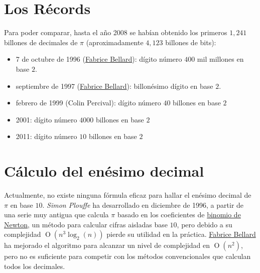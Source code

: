 
\section{Los Récords}

\begin{flushleft}
  Para poder comparar, hasta el año 2008 se habían obtenido los
  primeros $1,241$ billones de decimales de $\pi$ (aproximadamente
  $4,123$ billones de bits):
  \begin{itemize}
  \item 7 de octubre de 1996
    (\href{https://es.wikipedia.org/wiki/Fabrice_Bellard}{Fabrice
      Bellard}): dígito número $400$ mil millones en base $2$.
  \item septiembre de 1997
    (\href{https://es.wikipedia.org/wiki/Fabrice_Bellard}{Fabrice
      Bellard}): billonésimo dígito en base $2$.
  \item febrero de 1999 (Colin Percival): dígito número $40$ billones en
    base $2$
  \item 2001: dígito número $4000$ billones en base $2$
  \item 2011: dígito número $10$ billones en base $2$
  \end{itemize}
\end{flushleft}

\section{Cálculo del enésimo decimal}

\begin{flushleft}
  Actualmente, no existe ninguna fórmula eficaz para hallar el enésimo
  decimal de $\pi$ en base $10$. \textit{Simon Plouffe} ha
  desarrollado en diciembre de 1996, a partir de una serie muy antigua
  que calcula $\pi$ basado en los coeficientes de
  \href{https://es.wikipedia.org/wiki/Binomio_de_Newton}{binomio de
    Newton}, un método para calcular cifras aisladas base $10$, pero
  debido a su complejidad $\operatorname{O}(n^{3}\log_{2}(n))$ pierde
  su utilidad en la
  práctica. \href{https://es.wikipedia.org/wiki/Fabrice_Bellard}{Fabrice
    Bellard} ha mejorado el algoritmo para alcanzar un nivel de
  complejidad en $\operatorname{O}(n^{2})$, pero no es suficiente para
  competir con los métodos convencionales que calculan todos los
  decimales.
\end{flushleft}
